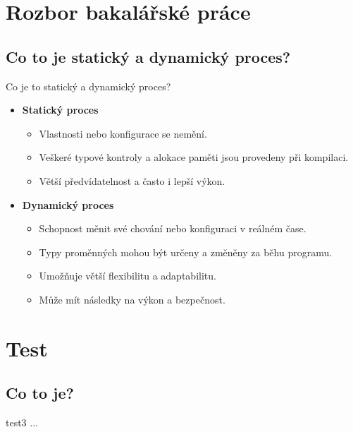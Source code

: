 \documentclass{beamer}
\begin{document}
\section{Rozbor bakalářské práce}
\subsection{Co to je statický a dynamický proces?}
\begin{frame}{Co je to statický a dynamický proces?}
	\begin{itemize}
		\item \textbf{Statický proces}
			\begin{itemize}
				\item[\textendash] Vlastnosti nebo konfigurace se nemění.
				\item[\textendash] Veškeré typové kontroly a alokace paměti jsou provedeny při kompilaci.
				\item[\textendash] Větší předvídatelnost a často i lepší výkon.
			\end{itemize}
		\item \textbf{Dynamický proces}
			\begin{itemize}
				\item[\textendash] Schopnost měnit své chování nebo konfiguraci v reálném čase.
				\item[\textendash] Typy proměnných mohou být určeny a změněny za běhu programu.
				\item[\textendash] Umožňuje větší flexibilitu a adaptabilitu.
				\item[\textendash] Může mít následky na výkon a bezpečnost.
			\end{itemize}
	\end{itemize}

\end{frame}

\section{Test}
\subsection{Co to je?}
\begin{frame}{test3}
...
\end{frame}
\end{document}
